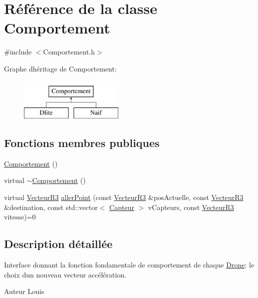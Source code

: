 \hypertarget{class_comportement}{}\section{Référence de la classe Comportement}
\label{class_comportement}


{\ttfamily \#include $<$Comportement.\+h$>$}

Graphe d\textquotesingle{}héritage de Comportement\+:\begin{figure}[H]
\begin{center}
\leavevmode
\includegraphics[height=2.000000cm]{class_comportement}
\end{center}
\end{figure}
\subsection*{Fonctions membres publiques}
\begin{DoxyCompactItemize}
\item 
\mbox{\hyperlink{class_comportement_a0c75007d7346cc14bb680eaa2981cb51}{Comportement}} ()
\item 
virtual \mbox{\hyperlink{class_comportement_acbe985635ed33cf141f380720c2e3f77}{$\sim$\+Comportement}} ()
\item 
virtual \mbox{\hyperlink{class_vecteur_r3}{Vecteur\+R3}} \mbox{\hyperlink{class_comportement_a38544976fc589cb8243c0c8071a692a6}{aller\+Point}} (const \mbox{\hyperlink{class_vecteur_r3}{Vecteur\+R3}} \&pos\+Actuelle, const \mbox{\hyperlink{class_vecteur_r3}{Vecteur\+R3}} \&destination, const std\+::vector$<$ \mbox{\hyperlink{class_capteur}{Capteur}} $>$ v\+Capteurs, const \mbox{\hyperlink{class_vecteur_r3}{Vecteur\+R3}} vitesse)=0
\end{DoxyCompactItemize}


\subsection{Description détaillée}
Interface donnant la fonction fondamentale de comportement de chaque \mbox{\hyperlink{class_drone}{Drone}}\+: le choix d\textquotesingle{}un nouveau vecteur accélération. \begin{DoxyAuthor}{Auteur}
Louis 
\end{DoxyAuthor}


